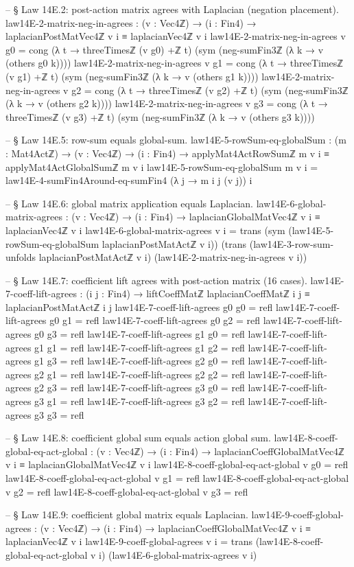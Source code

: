 \documentclass[11pt,a4paper]{book}
\begin{document}
\begin{code}
-- § Law 14E.2: post-action matrix agrees with Laplacian (negation placement).
law14E-2-matrix-neg-in-agrees : (v : Vec4ℤ) → (i : Fin4) →
  laplacianPostMatVec4ℤ v i ≡ laplacianVec4ℤ v i
law14E-2-matrix-neg-in-agrees v g0 =
  cong (λ t → threeTimesℤ (v g0) +ℤ t)
       (sym (neg-sumFin3ℤ (λ k → v (others g0 k))))
law14E-2-matrix-neg-in-agrees v g1 =
  cong (λ t → threeTimesℤ (v g1) +ℤ t)
       (sym (neg-sumFin3ℤ (λ k → v (others g1 k))))
law14E-2-matrix-neg-in-agrees v g2 =
  cong (λ t → threeTimesℤ (v g2) +ℤ t)
       (sym (neg-sumFin3ℤ (λ k → v (others g2 k))))
law14E-2-matrix-neg-in-agrees v g3 =
  cong (λ t → threeTimesℤ (v g3) +ℤ t)
       (sym (neg-sumFin3ℤ (λ k → v (others g3 k))))

-- § Law 14E.5: row-sum equals global-sum.
law14E-5-rowSum-eq-globalSum : (m : Mat4Actℤ) → (v : Vec4ℤ) → (i : Fin4) →
  applyMat4ActRowSumℤ m v i ≡ applyMat4ActGlobalSumℤ m v i
law14E-5-rowSum-eq-globalSum m v i =
  law14E-4-sumFin4Around-eq-sumFin4 (λ j → m i j (v j)) i

-- § Law 14E.6: global matrix application equals Laplacian.
law14E-6-global-matrix-agrees : (v : Vec4ℤ) → (i : Fin4) →
  laplacianGlobalMatVec4ℤ v i ≡ laplacianVec4ℤ v i
law14E-6-global-matrix-agrees v i =
  trans (sym (law14E-5-rowSum-eq-globalSum laplacianPostMatActℤ v i))
        (trans (law14E-3-row-sum-unfolds laplacianPostMatActℤ v i)
               (law14E-2-matrix-neg-in-agrees v i))

-- § Law 14E.7: coefficient lift agrees with post-action matrix (16 cases).
law14E-7-coeff-lift-agrees : (i j : Fin4) →
  liftCoeffMatℤ laplacianCoeffMatℤ i j ≡ laplacianPostMatActℤ i j
law14E-7-coeff-lift-agrees g0 g0 = refl
law14E-7-coeff-lift-agrees g0 g1 = refl
law14E-7-coeff-lift-agrees g0 g2 = refl
law14E-7-coeff-lift-agrees g0 g3 = refl
law14E-7-coeff-lift-agrees g1 g0 = refl
law14E-7-coeff-lift-agrees g1 g1 = refl
law14E-7-coeff-lift-agrees g1 g2 = refl
law14E-7-coeff-lift-agrees g1 g3 = refl
law14E-7-coeff-lift-agrees g2 g0 = refl
law14E-7-coeff-lift-agrees g2 g1 = refl
law14E-7-coeff-lift-agrees g2 g2 = refl
law14E-7-coeff-lift-agrees g2 g3 = refl
law14E-7-coeff-lift-agrees g3 g0 = refl
law14E-7-coeff-lift-agrees g3 g1 = refl
law14E-7-coeff-lift-agrees g3 g2 = refl
law14E-7-coeff-lift-agrees g3 g3 = refl

-- § Law 14E.8: coefficient global sum equals action global sum.
law14E-8-coeff-global-eq-act-global : (v : Vec4ℤ) → (i : Fin4) →
  laplacianCoeffGlobalMatVec4ℤ v i ≡ laplacianGlobalMatVec4ℤ v i
law14E-8-coeff-global-eq-act-global v g0 = refl
law14E-8-coeff-global-eq-act-global v g1 = refl
law14E-8-coeff-global-eq-act-global v g2 = refl
law14E-8-coeff-global-eq-act-global v g3 = refl

-- § Law 14E.9: coefficient global matrix equals Laplacian.
law14E-9-coeff-global-agrees : (v : Vec4ℤ) → (i : Fin4) →
  laplacianCoeffGlobalMatVec4ℤ v i ≡ laplacianVec4ℤ v i
law14E-9-coeff-global-agrees v i =
  trans (law14E-8-coeff-global-eq-act-global v i)
        (law14E-6-global-matrix-agrees v i)
\end{code}
\end{document}
